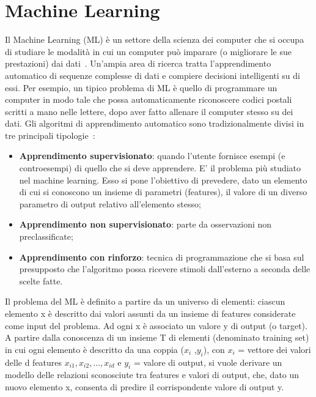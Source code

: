 \section{Machine Learning}
Il Machine Learning (ML) è un settore della scienza dei computer che si occupa di studiare le modalità in cui un computer può imparare (o migliorare le sue prestazioni) dai dati~\cite{10}. Un'ampia area di ricerca tratta l'apprendimento automatico di sequenze complesse di dati e compiere decisioni intelligenti su di essi. Per esempio, un tipico problema di ML è quello di programmare un computer in modo tale che possa automaticamente riconoscere codici postali scritti a mano nelle lettere, dopo aver fatto allenare il computer stesso su dei dati.
Gli algoritmi di apprendimento automatico sono tradizionalmente divisi in tre principali tipologie~\cite{10}:
\begin{itemize}
	\item \textbf{Apprendimento supervisionato}: quando l'utente fornisce esempi (e controesempi) di quello che si deve apprendere. E' il problema più studiato	nel machine learning. Esso si pone l’obiettivo di prevedere, dato un
	elemento di cui si conoscono un insieme di parametri (features), il valore di un diverso parametro di output relativo all’elemento stesso;
	\item \textbf{Apprendimento non supervisionato}: parte da osservazioni non preclassificate;
	\item \textbf{Apprendimento con rinforzo}: tecnica di programmazione che si basa sul 	presupposto che l'algoritmo possa ricevere stimoli dall'esterno a seconda
	delle scelte fatte.
\end{itemize}
Il problema del ML è definito a partire da un universo di elementi: ciascun elemento x è descritto dai valori assunti da un insieme di features considerate come input del problema. Ad ogni x è associato un valore y di output (o target). A partire dalla conoscenza di un insieme T di elementi (denominato training set) in cui ogni elemento è descritto da una coppia ($x_i$ ,$y_i$), con $x_i$ = vettore dei valori delle d features $x_{i1}, x_{i2}, ... , x_{id}$ e $y_i$ = valore di output, si vuole derivare un modello delle relazioni sconosciute tra features e valori di output, che, dato un nuovo elemento x, consenta di predire il corrispondente valore di output y. 
